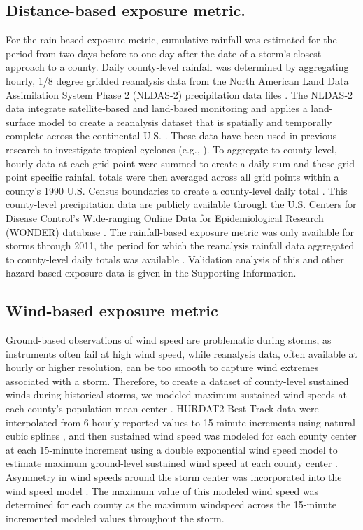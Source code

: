 \documentclass[fleqn,10pt,lineno]{olplainarticle}
\begin{document}
\subsection*{Distance-based exposure metric.}

For the rain-based exposure metric, cumulative rainfall was estimated for the
period from two days before to one day after the date of a storm's closest
approach to a county. Daily county-level rainfall was determined by aggregating
hourly, 1/8 degree gridded reanalysis data from the North American Land Data
Assimilation System Phase 2 (NLDAS-2) precipitation data files
\citep{rui2013nldas}. The NLDAS-2 data integrate satellite-based and land-based
monitoring and applies a land-surface model to create a reanalysis dataset that
is spatially and temporally complete across the continental U.S.
\citep{rui2013nldas, alhamdan2014environmental}. These data have been used in
previous research to investigate tropical cyclones (e.g., \citep{chen2015}). To
aggregate to county-level, hourly data at each grid point were summed to create
a daily sum and these grid-point specific rainfall totals were then averaged
across all grid points within a county's 1990 U.S. Census boundaries to create a
county-level daily total \citep{alhamdan2014environmental, cdcwonder}. This
county-level precipitation data are publicly available through the U.S. Centers
for Disease Control's Wide-ranging Online Data for Epidemiological Research
(WONDER) database \citep{cdcwonder, alhamdan2014environmental}. The
rainfall-based exposure metric was only available for storms through 2011, the
period for which the reanalysis rainfall data aggregated to county-level daily
totals was available \citep{cdcwonder, alhamdan2014environmental}. Validation
analysis of this and other hazard-based exposure data is given in the Supporting
Information.

\subsection*{Wind-based exposure metric}

Ground-based observations of wind speed are problematic during storms, as
instruments often fail at high wind speed, while reanalysis data, often
available at hourly or higher resolution, can be too smooth to capture wind
extremes associated with a storm. Therefore, to create a dataset of county-level
sustained winds during historical storms, we modeled maximum sustained wind
speeds at each county's population mean center \citep{countycenters}. HURDAT2
Best Track data were interpolated from 6-hourly reported values to 15-minute
increments using natural cubic splines \citep{stormwindmodel}, and then
sustained wind speed was modeled for each county center at each 15-minute
increment using a double exponential wind speed model
\citep{willoughby2006parametric} to estimate maximum ground-level sustained wind
speed at each county center \citep{stormwindmodel}. Asymmetry in wind speeds
around the storm center was incorporated into the wind speed model
\citep{phadke2003modeling, stormwindmodel}. The maximum value of this modeled
wind speed was determined for each county as the maximum windspeed across the
15-minute incremented modeled values throughout the storm.
\end{document}
